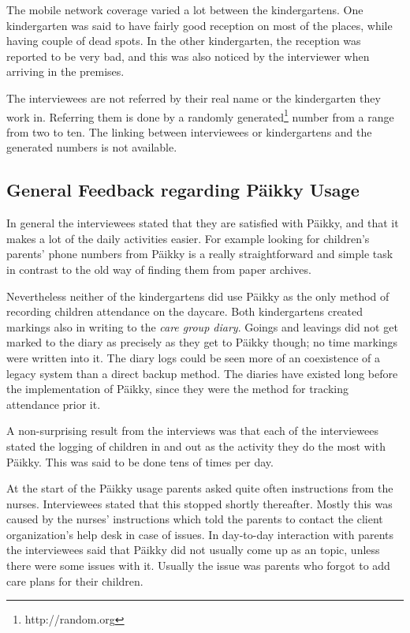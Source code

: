 The mobile network coverage varied a lot between the kindergartens. One kindergarten was said to  have fairly good reception on most of the places, while having couple of dead spots. In the other kindergarten, the reception was reported to be very bad, and this was also noticed by the interviewer when arriving in the premises. 

The interviewees are not referred by their real name or the kindergarten they work in. Referring them is done by a randomly generated\footnote{http://random.org} number from a range from two to ten. The linking between interviewees or kindergartens and the generated numbers is not available.



\subsection{General Feedback regarding Päikky Usage}

In general the interviewees stated that they are satisfied with Päikky, and that it makes a lot of the daily activities easier. For example looking for children's parents' phone numbers from Päikky is a really straightforward and simple task in contrast to the old way of finding them from paper archives. 

Nevertheless neither of the kindergartens did use Päikky as the only method of recording children attendance on the daycare. Both kindergartens created markings also in writing to the \textit{care group diary}. Goings and leavings did not get marked to the diary as precisely as they get to Päikky though; no time markings were written into it. The diary logs could be seen more of an coexistence of a legacy system than a direct backup method. The diaries have existed long before the implementation of Päikky, since they were the method for tracking attendance prior it. 

A non-surprising result from the interviews was that each of the interviewees stated the logging of children in and out as the activity they do the most with Päikky. This was said to be done tens of times per day.

At the start of the Päikky usage parents asked quite often instructions from the nurses. Interviewees stated that this stopped shortly thereafter. Mostly this was caused by the nurses' instructions which told the parents to contact the client organization's help desk in case of issues. In day-to-day interaction with parents the interviewees said that Päikky did not usually come up as an topic, unless there were some issues with it. Usually the issue was parents who forgot to add care plans for their children.

